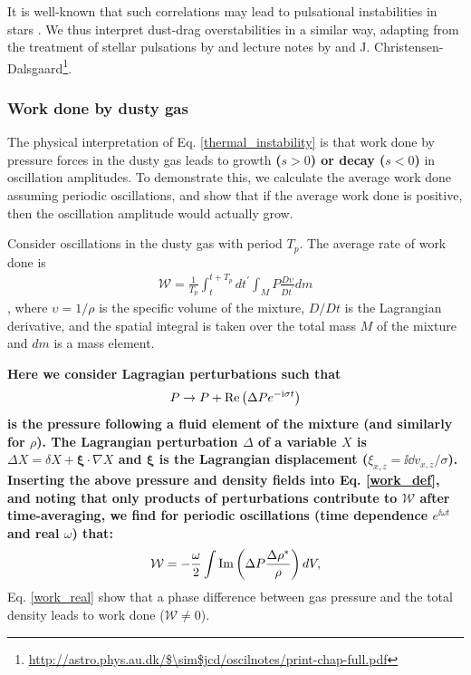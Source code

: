 It is well-known that such correlations may lead to pulsational
instabilities in stars \citep{cox67}. We thus interpret  
dust-drag overstabilities in a similar way, 
adapting from the treatment of stellar 
pulsations by \cite{cox67} and lecture notes by \cite{samadi15} and 
J. Christensen-Dalsgaard\footnote{\url{http://astro.phys.au.dk/$\sim$jcd/oscilnotes/print-chap-full.pdf}}.        
 


\subsubsection{Work done by dusty gas} 

The physical interpretation of Eq. \ref{thermal_instability} is that 
work done by pressure forces in the dusty gas leads to growth {\bf ($s>0$) or decay ($s<0$)} 
in oscillation amplitudes. 
To demonstrate this, we calculate the average
work done assuming periodic oscillations, and show that if the average
work done is positive, then the oscillation amplitude would actually grow. 

Consider oscillations in the dusty gas with period $T_p$. 
The average rate of work done is 
\begin{align}
  \mathcal{W} = \frac{1}{T_p}\int^{t+T_p}_{t}dt^\prime\int_M P
  \frac{D\upsilon}{Dt^\prime} dm \label{work_def} 
\end{align}
\citep[][see their Eq. 4.10 and related discussions]{cox67}, 
where $\upsilon=1/\rho$ is the specific volume of the mixture, $D/Dt$
is the Lagrangian derivative, and the 
spatial integral is taken over the total mass $M$ of the mixture and
$dm$ is a mass element. 

{\bf Here we consider Lagragian perturbations such that 
  \begin{align}
 P \to P + \operatorname{Re}\left(\Delta P e^{-\mathrm{i}\sigma t}\right)
 \end{align}
is the pressure following a fluid element of the mixture (and similarly for $\rho$). 
 The Lagrangian perturbation $\Delta$ of a variable $X$ is $\Delta X = \delta X + \bm{\xi}\cdot\nabla X$
 and $\bm{\xi}$ is the Lagrangian displacement ($\xi_{x,z} =  \ii\dd
 v_{x,z}/\sigma$). Inserting the above pressure and density fields
 into Eq. \ref{work_def}, and noting that only products of
 perturbations contribute to $\mathcal{W}$ after time-averaging, we
 find for periodic oscillations (time dependence $e^{\ii\omega t}$ and
 real $\omega$) that:  
}
\begin{align}
  \mathcal{W} = - \frac{\omega}{2} \int \operatorname{Im}\left(\Delta P
  \frac{\Delta \rho^*}{\rho}\right)dV,\label{work_real}
\end{align}
Eq. \ref{work_real} show that a phase difference between gas pressure and
the total density leads to work done
($\mathcal{W}\neq0$).  

